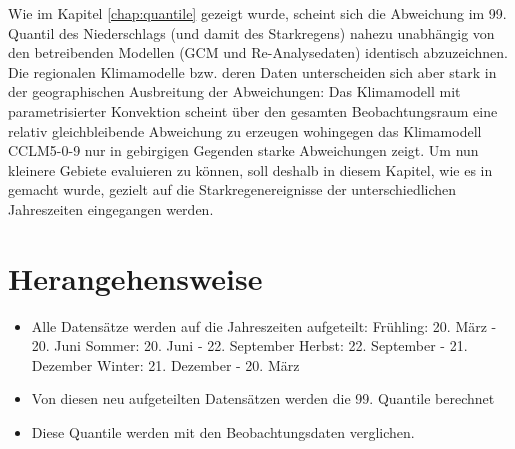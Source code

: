 Wie im Kapitel \ref{chap:quantile} gezeigt wurde, scheint sich die Abweichung im 99. Quantil des Niederschlags (und damit des Starkregens) nahezu unabhängig von den betreibenden Modellen (GCM und Re-Analysedaten) identisch abzuzeichnen. Die regionalen Klimamodelle bzw. deren Daten unterscheiden sich aber stark in der geographischen Ausbreitung der Abweichungen: Das Klimamodell mit parametrisierter Konvektion scheint über den gesamten Beobachtungsraum eine relativ gleichbleibende Abweichung zu erzeugen wohingegen das Klimamodell CCLM5-0-9 nur in gebirgigen Gegenden starke Abweichungen zeigt. Um nun kleinere Gebiete evaluieren zu können, soll deshalb in diesem Kapitel, wie es in \cite{biasMaraun} gemacht wurde, gezielt auf die Starkregenereignisse der unterschiedlichen Jahreszeiten eingegangen werden.
\section{Herangehensweise}\label{sec:Herangehensweise}
\begin{itemize}
\item Alle Datensätze werden auf die Jahreszeiten aufgeteilt:
	\subitem Frühling: 20. März - 20. Juni
	\subitem Sommer: 20. Juni - 22. September
	\subitem Herbst: 22. September - 21. Dezember
	\subitem Winter: 21. Dezember - 20. März
\item Von diesen neu aufgeteilten Datensätzen werden die 99. Quantile berechnet
\item Diese Quantile werden mit den Beobachtungsdaten verglichen.
\end{itemize}

